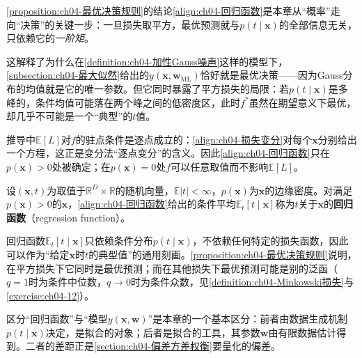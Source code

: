 \documentclass[../../main.tex]{subfiles}
\begin{document}
\begin{remark}
\cref{proposition:ch04-最优决策规则}的结论\eqref{align:ch04-回归函数}是本章从“概率”走向“决策”的关键一步：一旦损失取平方，最优预测就与$p(t\mid\boldsymbol{x})$的全部信息无关，只依赖它的\emph{一阶矩}。

这解释了为什么在\cref{definition:ch04-加性Gauss噪声}这样的模型下，\cref{subsection:ch04-最大似然}给出的$y(\boldsymbol{x},\boldsymbol{w}_{\mathrm{ML}})$恰好就是最优决策——因为Gauss分布的均值就是它的唯一参数。但它同时暴露了平方损失的局限：若$p(t\mid\boldsymbol{x})$是多峰的，条件均值可能落在两个峰之间的低密度区，此时$f^*$虽然在期望意义下最优，却几乎不可能是一个“典型”的$t$值。

推导中$\mathbb{E}[L]$对$f$的驻点条件是逐点成立的：\eqref{align:ch04-损失变分}对每个$\boldsymbol{x}$分别给出一个方程，这正是变分法“逐点变分”的含义。因此\eqref{align:ch04-回归函数}只在$p(\boldsymbol{x})>0$处被确定；在$p(\boldsymbol{x})=0$处$f$可以任意取值而不影响$\mathbb{E}[L]$。
\end{remark}

\begin{definition}[回归函数]\label{definition:ch04-回归函数}
设$(\boldsymbol{x},t)$为取值于$\mathbb{R}^{D}\times\mathbb{R}$的随机向量，$\mathbb{E}|t|<\infty$，$p(\boldsymbol{x})$为$\boldsymbol{x}$的边缘密度。对满足$p(\boldsymbol{x})>0$的$\boldsymbol{x}$，\eqref{align:ch04-回归函数}给出的条件平均$\mathbb{E}_t[t\mid\boldsymbol{x}]$称为$t$关于$\boldsymbol{x}$的\textbf{回归函数}（regression function）。
\end{definition}

\begin{remark}
回归函数$\mathbb{E}_t[t\mid\boldsymbol{x}]$只依赖条件分布$p(t\mid\boldsymbol{x})$，不依赖任何特定的损失函数，因此可以作为“给定$\boldsymbol{x}$时$t$的典型值”的通用刻画。\cref{proposition:ch04-最优决策规则}说明，在平方损失下它同时是最优预测；而在其他损失下最优预测可能是别的泛函（$q=1$时为条件中位数，$q\to0$时为条件众数，见\cref{definition:ch04-Minkowski损失}与\cref{exercise:ch04-12}）。

区分“回归函数”与“模型$y(\boldsymbol{x},\boldsymbol{w})$”是本章的一个基本区分：前者由数据生成机制$p(t\mid\boldsymbol{x})$决定，是拟合的对象；后者是拟合的工具，其参数$\boldsymbol{w}$由有限数据估计得到。二者的差距正是\cref{section:ch04-偏差方差权衡}要量化的偏差。
\end{remark}
\end{document}
